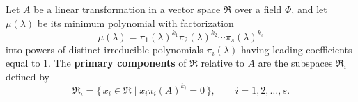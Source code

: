 Let $A$ be a linear transformation in a vector space $\Re$ over a field $\Phi$, and let $\mu(\lambda)$ be its minimum polynomial with factorization
$$
\mu(\lambda) = \pi_1(\lambda)^{k_1} \pi_2(\lambda)^{k_2} \cdots \pi_s(\lambda)^{k_s}
$$
into powers of distinct irreducible polynomials $\pi_i(\lambda)$ having leading coefficients equal to $1$. The \textbf{primary components} of $\Re$ relative to $A$ are the subspaces $\Re_i$ defined by
$$
\Re_i = \{\, x_i \in \Re \mid x_i \pi_i(A)^{k_i} = 0 \,\}, \qquad i = 1, 2, \dots, s.
$$
